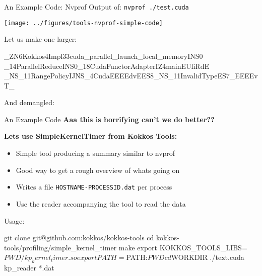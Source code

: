 
\begin{frame}[fragile]{An Example Code: Nvprof}
  Output of: \texttt{nvprof ./test.cuda}

  \texttt{[image: ../figures/tools-nvprof-simple-code]}

  \pause
Let us make one larger:

\vspace{-4pt}
\begin{code}
_ZN6Kokkos4Impl33cuda_parallel_launch_local_memoryINS0
_14ParallelReduceINS0_18CudaFunctorAdapterIZ4mainEUliRdE
_NS_11RangePolicyIJNS_4CudaEEEEdvEES8_NS_11InvalidTypeES7_EEEEvT_
\end{code}

And demangled:

\vspace{-4pt}
\end{frame}


\begin{frame}[fragile]{An Example Code}
\textbf{Aaa this is horrifying can't we do better??}

\pause
\vspace{10pt}
\textbf{Lets use SimpleKernelTimer from Kokkos Tools:}

\begin{itemize}
\item Simple tool producing a summary similar to nvprof
\item Good way to get a rough overview of whats going on
\item Writes a file \texttt{HOSTNAME-PROCESSID.dat} per process
\item Use the reader accompanying the tool to read the data
\end{itemize}

Usage:

\begin{code}[mathescape=false]
  git clone git@github.com:kokkos/kokkos-tools
  cd kokkos-tools/profiling/simple_kernel_timer
  make
  export KOKKOS_TOOLS_LIBS=${PWD}/kp_kernel_timer.so
  export PATH=${PATH}:${PWD}
  cd ${WORKDIR}
  ./text.cuda
  kp_reader *.dat
\end{code}

\end{frame}


